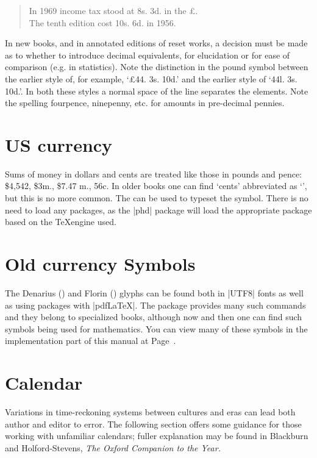 \begin{quote}
In 1969 income tax stood at 8s. 3d. in the £.\\
The tenth edition cost 10s. 6d. in 1956.
\end{quote}

In new books, and in annotated editions of reset works, a decision must
be made as to whether to introduce decimal equivalents, for elucidation
or for ease of comparison (e.g. in statistics). Note the distinction in the
pound symbol between the earlier style of, for example, `£44. 3s. 10d.'
and the earlier style of `44l. 3s. 10d.'. In both these styles a normal space
of the line separates the elements. Note the spelling fourpence, ninepenny, etc. for amounts in pre-decimal pennies.  

\section{US currency}

Sums of money in dollars and cents are treated like those in pounds and
pence: \$4,542, \$3m., \$7.47 m., 56c. In older books one can find \enquote*{cents} abbreviated as \enquote*{\textcent}, but this is no more common. The \cmd{\textcent} can be used to typeset the \textcent symbol. There is no need to load any packages, as the |phd| package will load the appropriate package based on the \TeX engine used.

\section{Old currency Symbols}
\index{\string \denarius}

The Denarius (\Denarius) and Florin (\Florin) glyphs can be found both in |UTF8| fonts as well as using packages with |pdfLaTeX|. The package  \citep{marvosym} provides many such commands and they belong to specialized books, although now and then one can find such symbols being used for mathematics. You can view many of these symbols in the implementation part of this manual at Page~\pageref{currencysymbols}.

\section{Calendar}

Variations in time-reckoning systems between cultures and eras can
lead both author and editor to error. The following section offers some
guidance for those working with unfamiliar calendars; fuller explanation
may be found in Blackburn and Holford-Stevens, \textit{The Oxford Companion
to the Year.}

